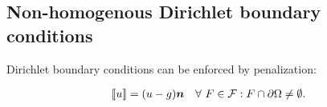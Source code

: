 \subsection{Non-homogenous Dirichlet boundary conditions}

Dirichlet boundary conditions can be enforced by penalization:

\begin{gather} \label{dirichlet}
    \llbracket u \rrbracket = (u - g) \bm{n} \quad \forall ~ F \in \mathcal{F} : F \cap \partial \Omega \neq \emptyset.
\end{gather}